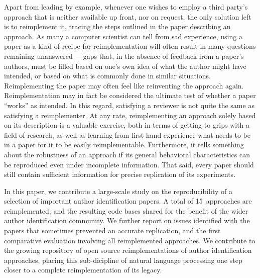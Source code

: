 Apart from leading by example, whenever one wishes to employ a third party's approach that is neither available up front, nor on request, the only solution left is to reimplement it, tracing the steps outlined in the paper describing an approach. As many a computer scientist can tell from sad experience, using a paper as a kind of recipe for reimplementation will often result in many questions remaining unanswered~\cite{fokkens:2013}---gaps that, in the absence of feedback from a paper's authors, must be filled based on one's own idea of what the author might have intended, or based on what is commonly done in similar situations. Reimplementing the paper may often feel like reinventing the approach again. Reimplementation may in fact be considered the ultimate test of whether a paper ``works'' as intended. In this regard, satisfying a reviewer is not quite the same as satisfying a reimplementer. At any rate, reimplementing an approach solely based on its description is a valuable exercise, both in terms of getting to grips with a field of research, as well as learning from first-hand experience what needs to be in a paper for it to be easily reimplementable. Furthermore, it tells something about the robustness of an approach if its general behavioral characteristics can be reproduced even under incomplete information. That said, every paper should still contain sufficient information for precise replication of its experiments.

In this paper, we contribute a large-scale study on the reproducibility of a selection of important author identification papers. A total of 15~approaches are reimplemented, and the resulting code bases shared for the benefit of the wider author identification community. We further report on issues identified with the papers that sometimes prevented an accurate replication, and the first comparative evaluation involving all reimplemented approaches. We contribute to the growing repository of open source reimplementations of author identification approaches, placing this sub-dicipline of natural language processing one step closer to a complete reimplementation of its legacy.
